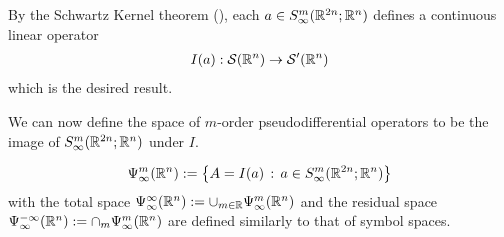 \documentclass[12pt]{article}
\begin{document}
By the Schwartz Kernel theorem (\cite{}), each $a \in S^{m}_\infty({\mathbb R}^{2n}; {\mathbb R}^n)$ defines a continuous linear operator 
\begin{align*}
I(a) : \mathcal{S}({\mathbb R}^n) \to \mathcal{S}'({\mathbb R}^n)
\end{align*}
which is the desired result. 


We can now define the space of $m$-order pseudodifferential operators to be the image of $S^{m}_{\infty}({\mathbb R}^{2n}; {\mathbb R}^{n})$ under $I$. 

\begin{fdefinition}
    \begin{align*}
    \Psi^{m}_\infty({\mathbb R}^n) := \left\{A = I(a) \, : \, a \in S^{m}_\infty({\mathbb R}^{2n}; {\mathbb R}^n)\right\}
    \end{align*}
    with the total space $\Psi^{\infty}_\infty({\mathbb R}^n) := \cup_{m \in {\ensuremath {\mathbb R}}} \Psi^m_\infty({\mathbb R}^n)$ and the residual space $\Psi^{-\infty}_\infty({\mathbb R}^n) := \cap_m \Psi^m_\infty({\mathbb R}^n)$ are defined similarly to that of symbol spaces. 
\end{fdefinition} 
\end{document}
